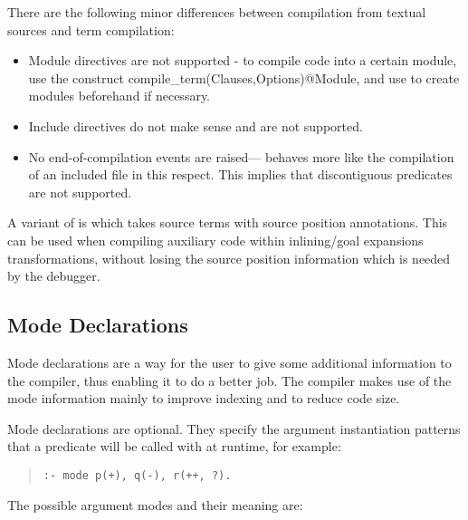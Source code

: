 There are the following minor differences between compilation from
textual sources and term compilation:
\begin{itemize}
\item Module directives are not supported - to compile code into a certain
    module, use the construct compile_term(Clauses,Options)@Module, and use
    to create modules beforehand if necessary.
\item Include directives do not make sense and are not supported.
\item No end-of-compilation events are raised---
  behaves more
    like the compilation of an included file in this respect. This implies
    that discontiguous predicates are not supported.
\end{itemize}

A variant of  is
which takes source terms with source position annotations.
This can be used when compiling auxiliary code within inlining/goal
expansions transformations, without losing the source position information
which is needed by the debugger.


\subsection{Mode Declarations}
Mode declarations are a way for the user to give some additional
information to the compiler, thus enabling it to do a better job.
The {\eclipse} compiler makes use of the mode information mainly to
improve indexing and to reduce code size.

Mode declarations are optional. They specify the argument instantiation
patterns that a predicate will be called with at runtime, for example:
\begin{quote}
\begin{verbatim}
:- mode p(+), q(-), r(++, ?).
\end{verbatim}
\end{quote}
The possible argument modes and their meaning are:

